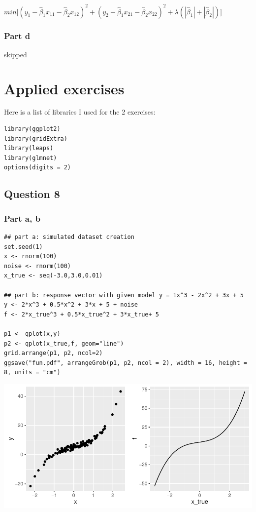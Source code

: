 \documentclass[11pt, a4paper]{article}
\begin{document}
$min\Big[ (y_1 - \hat{\beta}_1x_{11} - \hat{\beta}_2x_{12})^2 + (y_2 - \hat{\beta}_1x_{21} - \hat{\beta}_2x_{22})^2 + \lambda (|\hat{\beta}_1| + |\hat{\beta}_2|)\Big]$
\subsubsection{Part d}
\label{sec-1-1-4}

skipped
\section{Applied exercises}
\label{sec-2}


Here is a list of libraries I used for the 2 exercises:

\begin{verbatim}
library(ggplot2)
library(gridExtra)
library(leaps)
library(glmnet)
options(digits = 2)
\end{verbatim}
\subsection{Question 8}
\label{sec-2-1}
\subsubsection{Part a, b}
\label{sec-2-1-1}


\begin{verbatim}
## part a: simulated dataset creation
set.seed(1)
x <- rnorm(100)
noise <- rnorm(100)
x_true <- seq(-3.0,3.0,0.01)

## part b: response vector with given model y = 1x^3 - 2x^2 + 3x + 5
y <- 2*x^3 + 0.5*x^2 + 3*x + 5 + noise
f <- 2*x_true^3 + 0.5*x_true^2 + 3*x_true+ 5

p1 <- qplot(x,y)
p2 <- qplot(x_true,f, geom="line")
grid.arrange(p1, p2, ncol=2)
ggsave("fun.pdf", arrangeGrob(p1, p2, ncol = 2), width = 16, height = 8, units = "cm")
\end{verbatim}

\includegraphics[scale=1]{fun.pdf}
\end{document}
